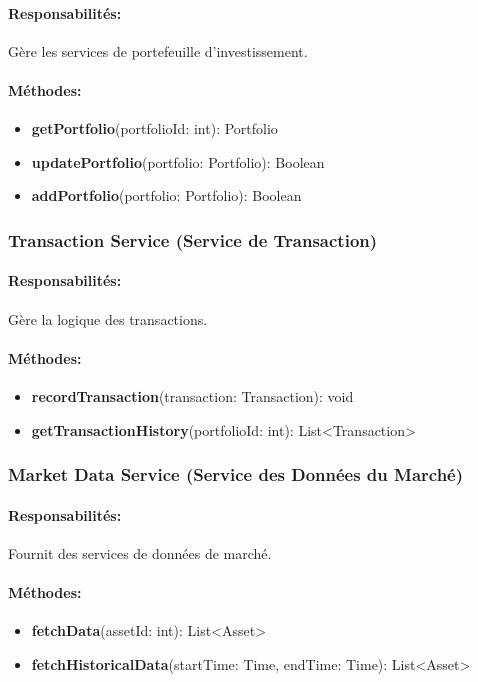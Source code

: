 \documentclass{article}
\begin{document}
\paragraph{Responsabilités:} Gère les services de portefeuille d'investissement.
\paragraph{Méthodes:}
\begin{itemize}
  \item \textbf{getPortfolio}(portfolioId: int): Portfolio
  \item \textbf{updatePortfolio}(portfolio: Portfolio): Boolean
  \item \textbf{addPortfolio}(portfolio: Portfolio): Boolean
\end{itemize}


\subsubsection{Transaction Service (Service de Transaction)}
\paragraph{Responsabilités:} Gère la logique des transactions.
\paragraph{Méthodes:}
\begin{itemize}
  \item \textbf{recordTransaction}(transaction: Transaction): void
  \item \textbf{getTransactionHistory}(portfolioId: int): List<Transaction>
\end{itemize}
\subsubsection{Market Data Service (Service des Données du Marché)}
\paragraph{Responsabilités:} Fournit des services de données de marché.
\paragraph{Méthodes:}
\begin{itemize}
  \item \textbf{fetchData}(assetId: int): List<Asset>
  \item \textbf{fetchHistoricalData}(startTime: Time, endTime: Time): List<Asset>
\end{itemize}
\end{document}
